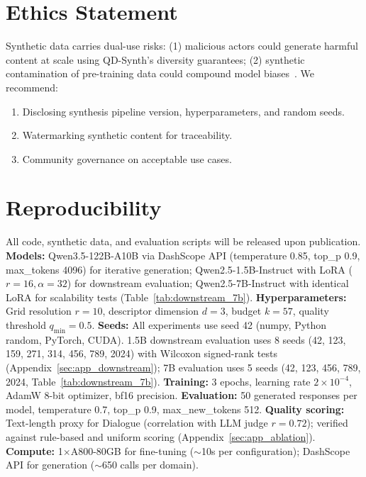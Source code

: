 \documentclass{article}
\begin{document}
\begin{enumerate}[nosep]
\section*{Ethics Statement}

Synthetic data carries dual-use risks: (1) malicious actors could generate harmful content at scale using QD-Synth's diversity guarantees; (2) synthetic contamination of pre-training data could compound model biases~\citep{data_collapse_2024}.
We recommend:
\begin{enumerate}[nosep]
  \item Disclosing synthesis pipeline version, hyperparameters, and random seeds.
  \item Watermarking synthetic content for traceability.
  \item Community governance on acceptable use cases.
\end{enumerate}

\section*{Reproducibility}

All code, synthetic data, and evaluation scripts will be released upon publication.
\textbf{Models:} Qwen3.5-122B-A10B via DashScope API (temperature 0.85, top\_p 0.9, max\_tokens 4096) for iterative generation; Qwen2.5-1.5B-Instruct with LoRA ($r{=}16, \alpha{=}32$) for downstream evaluation; Qwen2.5-7B-Instruct with identical LoRA for scalability tests (Table~\ref{tab:downstream_7b}).
\textbf{Hyperparameters:} Grid resolution $r{=}10$, descriptor dimension $d{=}3$, budget $k{=}57$, quality threshold $q_{\min}{=}0.5$.
\textbf{Seeds:} All experiments use seed 42 (numpy, Python random, PyTorch, CUDA). 1.5B downstream evaluation uses 8 seeds (42, 123, 159, 271, 314, 456, 789, 2024) with Wilcoxon signed-rank tests (Appendix~\ref{sec:app_downstream}); 7B evaluation uses 5 seeds (42, 123, 456, 789, 2024, Table~\ref{tab:downstream_7b}).
\textbf{Training:} 3 epochs, learning rate $2{\times}10^{-4}$, AdamW 8-bit optimizer, bf16 precision.
\textbf{Evaluation:} 50 generated responses per model, temperature 0.7, top\_p 0.9, max\_new\_tokens 512.
\textbf{Quality scoring:} Text-length proxy for Dialogue (correlation with LLM judge $r{=}0.72$); verified against rule-based and uniform scoring (Appendix~\ref{sec:app_ablation}).
\textbf{Compute:} 1$\times$A800-80GB for fine-tuning ($\sim$10s per configuration); DashScope API for generation ($\sim$650 calls per domain).


\end{enumerate}
\end{document}
